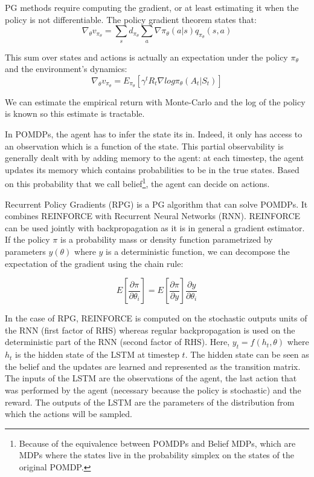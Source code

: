 \documentclass{article} %
\begin{document}
PG methods require computing the gradient, or at least estimating it when the policy is not differentiable. The policy gradient theorem states that:
$$
\nabla_{\theta} v_{\pi_{\theta}} = \sum_s d_{\pi_{\theta}} \sum_a \nabla \pi_{\theta}(a|s) q_{\pi_{\theta}}(s,a) %
$$

This sum over states and actions is actually an expectation under the policy $\pi_{\theta}$ and the environment's dynamics:
$$
\nabla_{\theta} v_{\pi_{\theta}} = E_{\pi_{\theta}}[\gamma^t R_t \nabla log \pi_{\theta}(A_t|S_t)] %
$$

We can estimate the empirical return with Monte-Carlo and the log of the policy is known so this estimate is tractable.


In POMDPs, the agent has to infer the state its in. Indeed, it only has access to an observation which is a function of the state. This partial observability is generally dealt with by adding memory to the agent: at each timestep, the agent updates its memory which contains probabilities to be in the true states. Based on this probability that we call belief\footnote{Because of the equivalence between POMDPs and Belief MDPs, which are MDPs where the states live in the probability simplex on the states of the original POMDP.}, the agent can decide on actions. 

Recurrent Policy Gradients\cite{wierstra2010recurrent} (RPG) is a PG algorithm that can solve POMDPs. It combines REINFORCE with Recurrent Neural Networks (RNN). REINFORCE can be used jointly with backpropagation as it is in general a gradient estimator\cite{williams1992simple}. If the policy $\pi$ is a probability mass or density function parametrized by parameters $y(\theta)$ where $y$ is a deterministic function, we can decompose the expectation of the gradient using the chain rule:

$$ E[\frac{\partial \pi}{\partial \theta_i}] = E[\frac{\partial \pi}{\partial y}] \frac{\partial y}{\partial \theta_{i}} $$

In the case of RPG, REINFORCE is computed on the stochastic outputs units of the RNN (first factor of RHS) whereas regular backpropagation is used on the deterministic part of the RNN (second factor of RHS). Here, $y_t = f(h_t, \theta)$ where $h_t$ is the hidden state of the LSTM at timestep $t$. The hidden state can be seen as the belief and the updates are learned and represented as the transition matrix. The inputs of the LSTM are the observations of the agent, the last action that was performed by the agent (necessary because the policy is stochastic) and the reward. The outputs of the LSTM are the parameters of the distribution from which the actions will be sampled.
\end{document}
